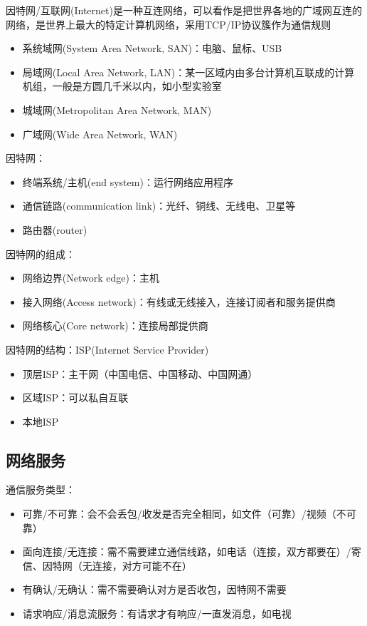 因特网/互联网(Internet)是一种互连网络，可以看作是把世界各地的广域网互连的网络，是世界上最大的特定计算机网络，采用TCP/IP协议簇作为通信规则
\begin{itemize}
	\item 系统域网(System Area Network, SAN)：电脑、鼠标、USB
	\item 局域网(Local Area Network, LAN)：某一区域内由多台计算机互联成的计算机组，一般是方圆几千米以内，如小型实验室
	\item 城域网(Metropolitan Area Network, MAN)
	\item 广域网(Wide Area Network, WAN)
\end{itemize}

因特网：
\begin{itemize}
	\item 终端系统/主机(end system)：运行网络应用程序
	\item 通信链路(communication link)：光纤、铜线、无线电、卫星等
	\item 路由器(router)
\end{itemize}

因特网的组成：
\begin{itemize}
	\item 网络边界(Network edge)：主机
	\item 接入网络(Access network)：有线或无线接入，连接订阅者和服务提供商
	\item 网络核心(Core network)：连接局部提供商
\end{itemize}

因特网的结构：ISP(Internet Service Provider)
\begin{itemize}
	\item 顶层ISP：主干网（中国电信、中国移动、中国网通）
	\item 区域ISP：可以私自互联
	\item 本地ISP
\end{itemize}

\subsection{网络服务}
通信服务类型：
\begin{itemize}
	\item 可靠/不可靠：会不会丢包/收发是否完全相同，如文件（可靠）/视频（不可靠）
	\item 面向连接/无连接：需不需要建立通信线路，如电话（连接，双方都要在）/寄信、因特网（无连接，对方可能不在）
	\item 有确认/无确认：需不需要确认对方是否收包，因特网不需要
	\item 请求响应/消息流服务：有请求才有响应/一直发消息，如电视
\end{itemize}

